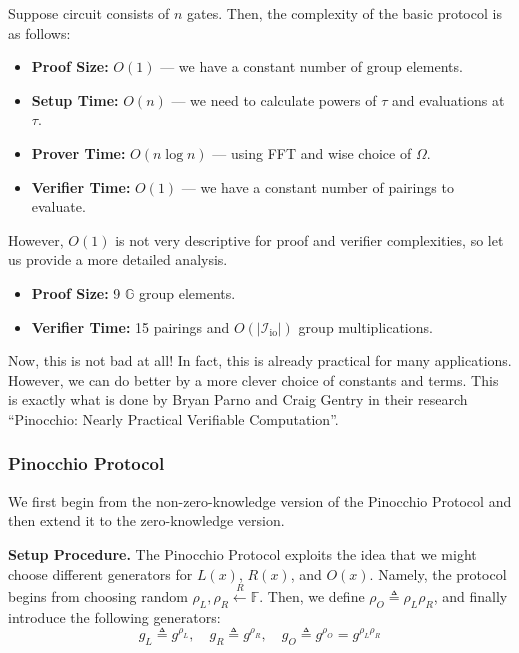 \documentclass[../lecture-notes.tex]{subfiles}
\begin{document}
\begin{proposition}
    Suppose circuit consists of $n$ gates. Then, the complexity of the basic protocol is as follows:
    \begin{itemize}[left=0mm]
        \item \textbf{Proof Size:} $O(1)$ --- we have a constant number of group elements.
        \item \textbf{Setup Time:} $O(n)$ --- we need to calculate powers of $\tau$ and evaluations at $\tau$.
        \item \textbf{Prover Time:} $O(n \log n)$ --- using FFT and wise choice of $\Omega$.
        \item \textbf{Verifier Time:} $O(1)$ --- we have a constant number of pairings to evaluate.
    \end{itemize}

    However, $O(1)$ is not very descriptive for proof and verifier complexities, so let us provide a more detailed analysis. 
    \begin{itemize}[left=0mm]
        \item \textbf{Proof Size:} 9 $\mathbb{G}$ group elements.
        \item \textbf{Verifier Time:} 15 pairings and $O(|\mathcal{I}_{\text{io}}|)$ group multiplications.
    \end{itemize}
\end{proposition}

Now, this is not bad at all! In fact, this is already practical for many applications. However, we can do better by a more clever choice of constants and terms. This is exactly what is done by Bryan Parno and Craig Gentry in their research ``Pinocchio: Nearly Practical Verifiable Computation''.

\subsubsection{Pinocchio Protocol}

We first begin from the non-zero-knowledge version of the Pinocchio Protocol and then extend it to the zero-knowledge version.

\textcolor{blue!75!gray}{\textbf{Setup Procedure.}} The Pinocchio Protocol exploits the idea that we might 
choose different generators for $L(x)$, $R(x)$, and $O(x)$. 
Namely, the protocol begins from choosing random $\rho_L,\rho_R \xleftarrow{R} \mathbb{F}$. 
Then, we define $\rho_O \triangleq \rho_L\rho_R$, and finally introduce the following generators:
\begin{equation*}
    g_L \triangleq g^{\rho_L}, \quad g_R \triangleq g^{\rho_R}, \quad g_O \triangleq g^{\rho_O} = g^{\rho_L\rho_R}
\end{equation*}
\end{document}
